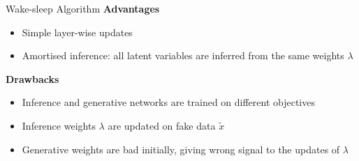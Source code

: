 \begin{frame}{Wake-sleep Algorithm}
\textbf{Advantages}
\begin{itemize}
\item Simple layer-wise updates
\item Amortised inference: all latent variables are inferred from the same weights $ \lambda $
\end{itemize}
\pause
\textbf{Drawbacks}
\begin{itemize}
\item Inference and generative networks are trained on different objectives
\item Inference weights $ \lambda $ are updated on fake data $ \tilde{x} $
\item Generative weights are bad initially, giving wrong signal to the updates of $ \lambda $
\end{itemize}
\end{frame}
